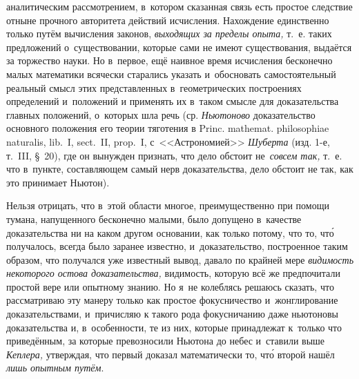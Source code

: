 аналитическим рассмотрением, в~котором сказанная связь есть простое следствие
отныне прочного авторитета действий исчисления. Нахождение единственно только
путём вычисления законов, {\em выходящих за пределы опыта,} т.~е. таких
предложений о~существовании, которые сами не имеют существования, выдаётся за
торжество науки. Но в~первое, ещё наивное время исчисления бесконечно малых
математики всячески старались указать и~обосновать самостоятельный реальный
смысл этих представленных в~геометрических построениях определений и~положений
и применять их в~таком смысле для доказательства главных положений, о~которых
шла речь (ср. {\em Ньютоново} доказательство основного положения его теории
тяготения в Princ. mathemat. philoso\-phiae naturalis, lib.~I, sect.~II,
prop.~I, с~<<Астрономией>> {\em Шуберта} (изд. 1-е, т.~III, \S~20), где он
вынужден признать, что дело обстоит не~{\em совсем так,} т.~е. что в~пункте,
составляющем самый нерв доказательства, дело обстоит не так,
как это принимает Ньютон).

Нельзя отрицать, что в~этой области многое, преимущественно при помощи тумана,
напущенного бесконечно малыми, было допущено в~качестве доказательства ни на
каком другом основании, как только потому, что то, чт\'{о} получалось, всегда было
заранее известно, и~доказательство, построенное таким образом, что получался
уже известный вывод, давало по крайней мере {\em видимость некоторого остова
доказательства,} видимость, которую всё же предпочитали простой вере или
опытному знанию. Но я~не колеблясь решаюсь сказать, что рассматриваю эту манеру
только как простое фокусничество и~жонглирование доказательствами, и~причисляю
к такого рода фокусничанию даже ньютоновы доказательства и, в~особенности, те
из них, которые принадлежат к~только что приведённым, за которые превозносили
Ньютона до небес и~ставили выше {\em Кеплера,} утверждая, что первый доказал
математически то, чт\'{о} второй нашёл {\em лишь опытным путём}.


